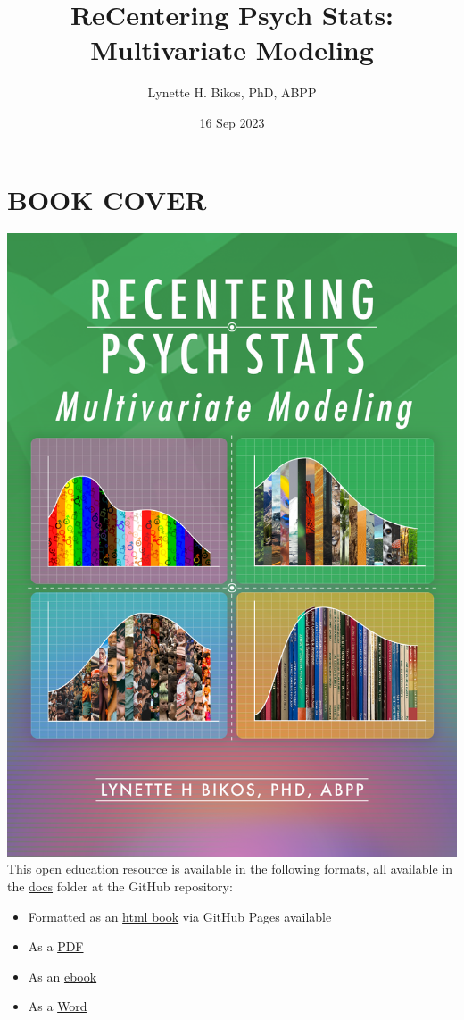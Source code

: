 \documentclass[
  11pt,
]{book}
\title{ReCentering Psych Stats: Multivariate Modeling}
\author{Lynette H. Bikos, PhD, ABPP}
\date{16 Sep 2023}
\providecommand{\tightlist}{%
  \setlength{\itemsep}{0pt}\setlength{\parskip}{0pt}}
\begin{document}
\maketitle

{
\hypersetup{linkcolor=}
\setcounter{tocdepth}{3}
\tableofcontents
}
\hypertarget{book-cover}{%
\chapter*{BOOK COVER}\label{book-cover}}


\includegraphics{images/ReC_multivariate_bkcvr.png} This open education resource is available in the following formats, all available in the \href{https://github.com/lhbikos/ReC_MultivModel/tree/main/docs}{docs} folder at the GitHub repository:

\begin{itemize}
\tightlist
\item
  Formatted as an \href{https://lhbikos.github.io/ReC_MultivModel/}{html book} via GitHub Pages available
\item
  As a \href{https://github.com/lhbikos/ReC_MultivModel/blob/main/docs/ReC_MultMod.pdf}{PDF}
\item
  As an \href{https://github.com/lhbikos/ReC_MultivModel/blob/main/docs/ReC_MultMod.epub}{ebook}
\item
  As a \href{https://github.com/lhbikos/ReC_MultivModel/blob/main/docs/ReC_MultMod.docx}{Word}
\end{itemize}
\end{document}
